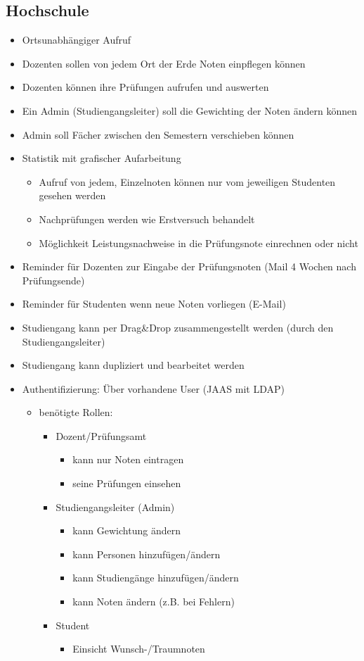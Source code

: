 \documentclass[12pt,a4paper,parskip]{scrreprt}
\begin{document}
\subsection{Hochschule}
\begin{itemize}
\item Ortsunabhängiger Aufruf
\item Dozenten sollen von jedem Ort der Erde Noten einpflegen können
\item Dozenten können ihre Prüfungen aufrufen und auswerten
\item Ein Admin (Studiengangsleiter) soll die Gewichting der Noten ändern können
\item Admin soll Fächer zwischen den Semestern verschieben können
\item Statistik mit grafischer Aufarbeitung
\begin{itemize}
\item Aufruf von jedem, Einzelnoten können nur vom jeweiligen Studenten gesehen werden
\item Nachprüfungen werden wie Erstversuch behandelt
\item Möglichkeit Leistungsnachweise in die Prüfungsnote einrechnen oder nicht
\end{itemize}
\item Reminder für Dozenten zur Eingabe der Prüfungsnoten (Mail 4 Wochen nach Prüfungsende)
\item Reminder für Studenten wenn neue Noten vorliegen (E-Mail)
\item Studiengang kann per Drag\&Drop zusammengestellt werden (durch den Studiengangsleiter)
\item Studiengang kann dupliziert und bearbeitet werden
\item Authentifizierung: Über vorhandene User (JAAS mit LDAP)
\begin{itemize}
\item benötigte Rollen:
\begin{itemize}
\item Dozent/Prüfungsamt
\begin{itemize}
\item kann nur Noten eintragen
\item seine Prüfungen einsehen
\end{itemize}
\item Studiengangsleiter (Admin)
\begin{itemize}
\item kann Gewichtung ändern
\item kann Personen hinzufügen/ändern
\item kann Studiengänge hinzufügen/ändern
\item kann Noten ändern (z.B. bei Fehlern)
\end{itemize}
\item Student
\begin{itemize}
\item Einsicht Wunsch-/Traumnoten
\end{itemize}		
\end{itemize}
\end{itemize}
\end{itemize}
\end{document}
